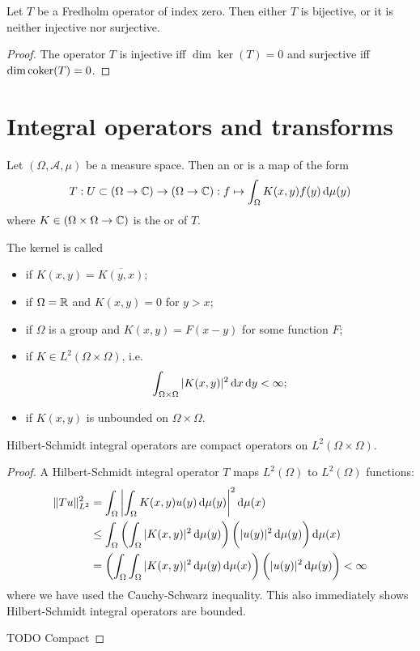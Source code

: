 \begin{lemma} \label{lemma:FredholmAlternative}
Let $T$ be a Fredholm operator of index zero. Then either $T$ is bijective, or it is neither injective nor surjective.
\end{lemma}
\begin{proof}
The operator $T$ is injective iff $\dim\ker(T) = 0$ and surjective iff $\dim\operatorname{coker}(T) = 0$.
\end{proof}


\section{Integral operators and transforms}
\begin{definition}
Let $(\Omega, \mathcal{A}, \mu)$ be a measure space. Then an  or  is a map of the form
\[ T: U\subset (\Omega\to\mathbb{C}) \to (\Omega\to\mathbb{C}): f \mapsto \int_\Omega K(x,y)f(y) \operatorname{d \!}{\mu(y)} \]
where $K\in (\Omega\times \Omega \to \mathbb{C})$ is the  or  of $T$.

The kernel is called
\begin{itemize}
\item {} if $K(x,y) = \overline{K(y,x)}$;
\item {} if $\Omega = \mathbb{R}$ and $K(x,y) = 0$ for $y>x$;
\item {} if $\Omega$ is a group and $K(x,y) = F(x-y)$ for some function $F$;
\item {} if $K\in L^2(\Omega\times \Omega)$, i.e.
\[ \int_{\Omega\times \Omega}|K(x,y)|^2\operatorname{d \!}{x}\operatorname{d \!}{y} < \infty; \]
\item {} if $K(x,y)$ is unbounded on $\Omega\times \Omega$.
\end{itemize}
\end{definition}

\begin{lemma}
Hilbert-Schmidt integral operators are compact operators on $L^2(\Omega\times \Omega)$.
\end{lemma}
\begin{proof}
A Hilbert-Schmidt integral operator $T$ maps $L^2(\Omega)$ to $L^2(\Omega)$ functions:
\begin{align*}
\norm{Tu}^2_{L^2} &= \int_\Omega \left|\int_{\Omega} K(x,y)u(y)\diff{\mu(y)}\right|^2\diff{\mu(x)} \\
&\leq \int_\Omega \left(\int_{\Omega} |K(x,y)|^2\diff{\mu(y)}\right) \bigg( |u(y)|^2\diff{\mu(y)}\bigg)\diff{\mu(x)} \\
&= \left(\int_\Omega \int_{\Omega} |K(x,y)|^2\diff{\mu(y)}\diff{\mu(x)}\right) \bigg( |u(y)|^2\diff{\mu(y)}\bigg) < \infty
\end{align*}
where we have used the Cauchy-Schwarz inequality. This also immediately shows Hilbert-Schmidt integral operators are bounded.

TODO Compact
\end{proof}

